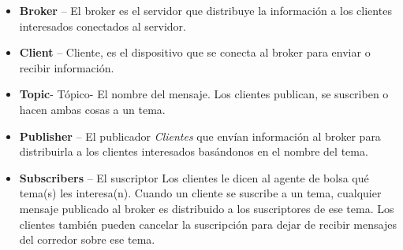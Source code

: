 \begin{itemize}
    \item \textbf{Broker} – El broker es el servidor que distribuye la información a los clientes interesados conectados al servidor.
    \item \textbf{Client} – Cliente, es el dispositivo que se conecta al broker para enviar o recibir información.
    \item \textbf{Topic}- T\'opico- El nombre del mensaje. Los clientes publican, se suscriben o hacen ambas cosas a un tema.
    \item \textbf{Publisher} – El publicador \textit{Clientes} que envían información al broker para distribuirla a los clientes interesados bas\'andonos en el nombre del tema.
    \item \textbf{Subscribers} – El suscriptor Los clientes le dicen al agente de bolsa qué tema(s) les interesa(n). Cuando un cliente se suscribe a un tema, cualquier mensaje publicado al broker es distribuido a los suscriptores de ese tema. Los clientes también pueden cancelar la suscripción para dejar de recibir mensajes del corredor sobre ese tema.
\end{itemize}

